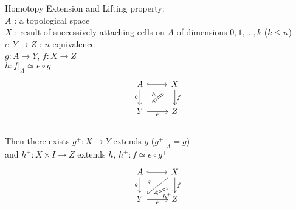     \begin{thm}
        Homotopy Extension and Lifting property\label{hyp:HELP}:\\
        $A$ : a topological space\\
        $X$ : result of successively attaching cells on $A$ of dimensions $0,1,\dots,k$ ($k \leq n$)\\
        $e : Y \to Z$ : $n$-equivalence\\
        $g : A \to Y$, $f : X \to Z$\\
        $h : f|_A  \simeq e \circ g $\\

        \[\begin{tikzcd}
            A & X \\
            Y & Z
            \arrow["g"', from=1-1, to=2-1]
            \arrow[hook, from=1-1, to=1-2]
            \arrow["f", from=1-2, to=2-2]
            \arrow["e"', from=2-1, to=2-2]
            \arrow["h"', shorten <=7pt, shorten >=7pt, Rightarrow, from=1-2, to=2-1]
        \end{tikzcd}\]\\
        Then there exists
        $g^+ : X \to Y$ extends $g$ ($g^+|_A = g$)\\
        and $h^+ : X \times I \to Z$ extends $h$, $h^+ : f \simeq e \circ g^+$
        \[\begin{tikzcd}
            A & X \\
            Y & Z
            \arrow["g"', from=1-1, to=2-1]
            \arrow[hook, from=1-1, to=1-2]
            \arrow[""{name=0, anchor=center, inner sep=0}, "f", from=1-2, to=2-2]
            \arrow["e"', from=2-1, to=2-2]
            \arrow["{g^+}"', from=1-2, to=2-1]
            \arrow["{h^+}", shorten <=9pt, shorten >=9pt, Rightarrow, from=0, to=2-1]
        \end{tikzcd}\]
    \end{thm}

